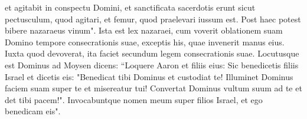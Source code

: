 \begin{biblechapter}
\verse et agitabit in conspectu Domini, et sanctificata sacerdotis erunt sicut pectusculum, quod agitari, et femur, quod praelevari iussum est. Post haec potest bibere nazaraeus vinum". 
\verse Ista est lex nazaraei, cum voverit oblationem suam Domino tempore consecrationis suae, exceptis his, quae invenerit manus eius. Iuxta quod devoverat, ita faciet secundum legem consecrationis suae. 
\verse Locutusque est Dominus ad Moysen dicens: 
\verse “Loquere Aaron et filiis eius: Sic benedicetis filiis Israel et dicetis eis: 
\verse "Benedicat tibi Dominus et custodiat te! 
\verse Illuminet Dominus faciem suam super te et misereatur tui! 
\verse Convertat Dominus vultum suum ad te et det tibi pacem!". 
\verse Invocabuntque nomen meum super filios Israel, et ego benedicam eis". 
\end{biblechapter}


